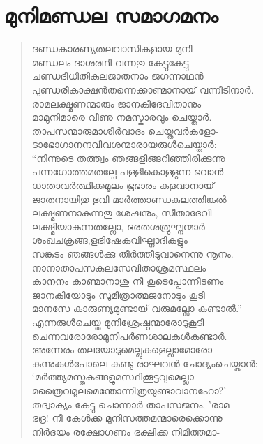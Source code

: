 \section{മുനിമണ്ഡല സമാഗമനം}

\begin{verse}
ദണ്ഡകാരണ്യതലവാസികളായ മുനി-\\
മണ്ഡലം ദാശരഥി വന്നതു കേട്ടുകേട്ടു\\
ചണ്ഡദീധിതികുലജാതനാം ജഗന്നാഥന്‍\\
പുണ്ഡരീകാക്ഷന്‍തന്നെക്കാണ്മാനായ് വന്നീടിനാര്‍.\\
രാമലക്ഷ്മണന്മാരും ജാനകീദേവിതാനും\\
മാമുനിമാരെ വീണു നമസ്കാരവും ചെയ്താര്‍.\\
താപസന്മാരുമാശീര്‍വാദം ചെയ്തവര്‍കളോ-\\
ടാഭോഗാനന്ദവിവശന്മാരായരുള്‍ചെയ്താര്‍:\\
“നിന്നുടെ തത്ത്വം ഞങ്ങളിങ്ങറിഞ്ഞിരിക്കുന്നു\\
പന്നഗോത്തമതല്പേ പള്ളികൊള്ളുന്ന ഭവാന്‍\\
ധാതാവര്‍ത്ഥിക്കമൂലം ഭൂഭാരം കളവാനായ്\\
ജാതനായിതു ഭുവി മാര്‍ത്താണ്ഡകുലത്തിങ്കല്‍\\
ലക്ഷ്മണനാകുന്നതു ശേഷനും, സീതാദേവി\\
ലക്ഷ്മിയാകുന്നതല്ലോ, ഭരതശത്രുഘ്നന്മാര്‍\\
ശംഖചക്രങ്ങ,ളഭിഷേകവിഘ്നാദികളും\\
സങ്കടം ഞങ്ങള്‍ക്കു തീര്‍ത്തീടുവാനെന്നു നൂനം.\\
നാനാതാപസകുലസേവിതാശ്രമസ്ഥലം\\
കാനനം കാണ്മാനാശു നീ കൂടെപ്പോന്നീടണം\\
ജാനകിയോടും സുമിത്രാത്മജനോടും കൂടി\\
മാനസേ കാരുണ്യമുണ്ടായ് വരുമല്ലോ കണ്ടാല്‍.”\\
എന്നരുള്‍ചെയ്ത മുനിശ്രേഷ്ഠന്മാരോടുകൂടി\\
ചെന്നവരോരോമുനിപര്‍ണശാലകള്‍കണ്ടാര്‍.\\
അന്നേരം തലയോടുമെല്ലുകളെല്ലാമോരോ\\
കുന്നുകള്‍പോലെ കണ്ടു രാഘവന്‍ ചോദ്യംചെയ്താന്‍:\\
‘മര്‍ത്ത്യമസ്തകങ്ങളുമസ്ഥിക്കൂട്ടവുമെല്ലാ-\\
മത്രൈവമൂലമെന്തോന്നിത്രയുണ്ടാവാനഹോ?’\\
തദ്വാക്യം കേട്ടു ചൊന്നാര്‍ താപസജനം, ’രാമ-\\
ഭദ്ര! നീ കേള്‍ക്ക മുനിസത്തമന്മാരെക്കൊന്നു\\
നിര്‍ദയം രക്ഷോഗണം ഭക്ഷിക്ക നിമിത്തമാ-\\

\end{verse}
